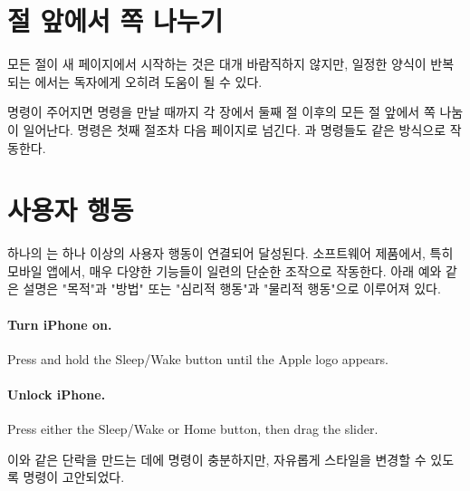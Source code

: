 \documentclass[pairquote, minted]{hzguide}
\begin{document}
\section{절 앞에서 쪽 나누기}

모든 절이 새 페이지에서 시작하는 것은 대개 바람직하지 않지만, 일정한 양식이 반복되는 에서는 독자에게 오히려 도움이 될 수 있다.

\begin{code}
\SectionNewpageOn*
\SectionNewpageOff
\SubsectionNewpageOn
\SubsectionNewpageOff
\end{code}

\macro{\SectionNewpageOn} 명령이 주어지면 \macro{\SectionNewpageOff} 명령을 만날 때까지 각 장에서 둘째 절 이후의 모든 절 앞에서 쪽 나눔이 일어난다.
\macro{\SectionNewpageOn*} 명령은 첫째 절조차 다음 페이지로 넘긴다.
\macro{\SubsectionNewpageOn}과 \macro{\SubsectionNewpageOff} 명령들도 같은 방식으로 작동한다.

\section{사용자 행동}

하나의 는 하나 이상의 사용자 행동이 연결되어 달성된다.
소프트웨어 제품에서, 특히 모바일 앱에서, 매우 다양한 기능들이 일련의 단순한 조작으로 작동한다.
아래 예와 같은 설명은 "목적"과 "방법" 또는 "심리적 행동"과 "물리적 행동"으로 이루어져 있다.

\begin{example}
\vspace*{-1.5\onelineskip}
\paragraph{Turn iPhone on.} Press and hold the Sleep/Wake button until the Apple logo appears.
\paragraph{Unlock iPhone.} Press either the Sleep/Wake or Home button, then drag the slider.
\end{example}

\noindent 이와 같은 단락을 만드는 데에 \macro{\paragraph} 명령이 충분하지만, 자유롭게 스타일을 변경할 수 있도록 \macro{\action} 명령이 고안되었다.
\end{document}
